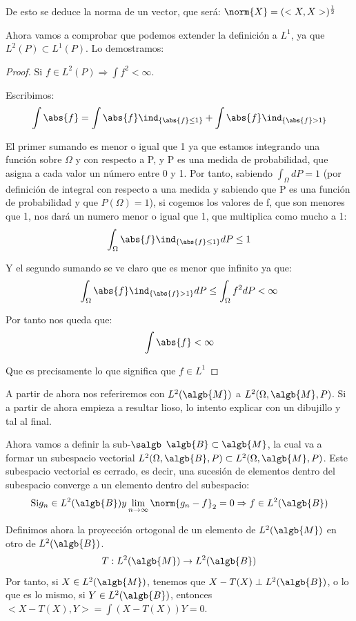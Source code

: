 \documentclass{apuntes}
\begin{document}
De esto se deduce la norma de un vector, que será: $\norm{X}=(<X,X>)^{\frac{1}{2}}$

Ahora vamos a comprobar que podemos extender la definición a $L^1$, ya que $L^2(P) \subset L^1(P)$. Lo demostramos:

\begin{proof}
Si $f \in L^2(P) \Rightarrow \int f^2 < \infty$.

Escribimos:
\[
\int \abs{f} = \int \abs{f}\ind_{\{\abs{f}\leq 1\}} + \int \abs{f}\ind_{\{\abs{f}> 1\}}
\]

El primer sumando es menor o igual que 1 ya que estamos integrando una función sobre $\Omega$ y con respecto a P, y P es una medida de probabilidad, que asigna a cada valor un número entre 0 y 1. Por tanto, sabiendo $\int_{\Omega}dP = 1$ (por definición de integral con respecto a una medida y sabiendo que P es una función de probabilidad y que $P(\Omega)=1$), si cogemos los valores de f, que son menores que 1, nos dará un numero menor o igual que 1, que multiplica como mucho a 1:
\[
\int_{\Omega} \abs{f}\ind_{\{\abs{f}\leq 1\}}dP \leq 1
\]

Y el segundo sumando se ve claro que es menor que infinito ya que:
\[
 \int_{\Omega} \abs{f}\ind_{\{\abs{f}> 1\}}dP \leq  \int_{\Omega} f^2 dP < \infty
\]

Por tanto nos queda que:
\[
\int \abs{f} < \infty
\]

Que es precisamente lo que significa que $f\in L^1$
\end{proof}


A partir de ahora nos referiremos con $L^2(\algb{M})$ a $L^2(\Omega,\algb{M},P)$.
Si a partir de ahora empieza a resultar lioso, lo intento explicar con un dibujillo y tal al final.

Ahora vamos a definir la sub-$\salgb$ $\algb{B} \subset \algb{M}$, la cual va a formar un subespacio vectorial $L^2(\Omega,\algb{B},P) \subset L^2(\Omega,\algb{M},P)$. Este subespacio vectorial es cerrado, es decir, una sucesión de elementos dentro del subespacio converge a un elemento dentro del subespacio:
\[
\text{Si} g_n \in L^2(\algb{B}) y \lim_{n \rightarrow \infty} \norm{g_n -f}_2 = 0 \Rightarrow f \in L^2(\algb{B})
\]

Definimos ahora la proyección ortogonal de un elemento de $L^2(\algb{M})$ en otro de $L^2(\algb{B})$.
\[
T: L^2(\algb{M}) \rightarrow L^2(\algb{B})
\]
Por tanto, si $X\in L^2(\algb{M})$, tenemos que $X-T(X) \perp L^2(\algb{B})$, o lo que es lo mismo, si $Y \in L^2(\algb{B})$, entonces $<X-T(X),Y>=\int(X-T(X))Y = 0$.
\end{document}
